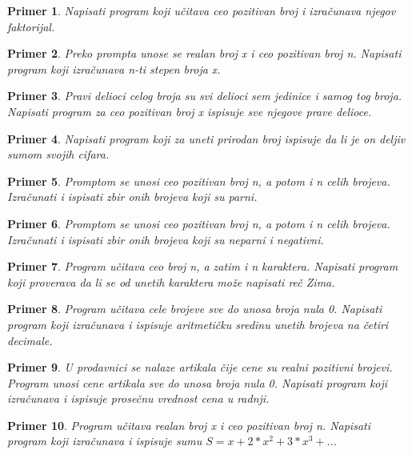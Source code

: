 \documentclass[a4paper]{article}
\newtheorem{primer}{Primer}[section]
\begin{document}
\begin{primer}
Napisati program koji učitava ceo pozitivan broj i izračunava
njegov faktorijal. 
\end{primer}

\begin{primer}
Preko prompta unose se realan broj x i ceo pozitivan
broj n. Napisati program koji izračunava n-ti stepen broja x.
\end{primer}

\begin{primer}
Pravi delioci celog broja su svi delioci sem jedinice i samog
tog broja. Napisati program za ceo pozitivan broj x ispisuje sve njegove
prave delioce.
\end{primer}

\begin{primer}
Napisati program koji za uneti prirodan broj ispisuje da li
je on deljiv sumom svojih cifara.
\end{primer}

\begin{primer}
Promptom se unosi ceo pozitivan broj n, a potom i n celih
brojeva. Izračunati i ispisati zbir onih brojeva koji su parni.
\end{primer}

\begin{primer}
Promptom se unosi ceo pozitivan broj n, a potom i n celih
brojeva. Izračunati i ispisati zbir onih brojeva koji su neparni i negativni.
\end{primer}


\begin{primer}
Program učitava ceo broj n, a zatim i n karaktera. Napisati
program koji proverava da li se od unetih karaktera može napisati reč Zima.
\end{primer}

\begin{primer}
Program učitava cele brojeve sve do unosa broja nula 0.
Napisati program koji izračunava i ispisuje aritmetičku sredinu unetih brojeva na
četiri decimale.
\end{primer}

\begin{primer}
U prodavnici se nalaze artikala čije cene su realni pozitivni
brojevi. Program unosi cene artikala sve do unosa broja nula 0. Napisati program
koji izračunava i ispisuje prosečnu vrednost cena u radnji.
\end{primer}

\begin{primer}
Program učitava realan broj x i ceo pozitivan broj n.
Napisati program koji izračunava i ispisuje sumu $S=x + 2*x^2 + 3*x^3 + ..$.
\end{primer}
\end{document}
